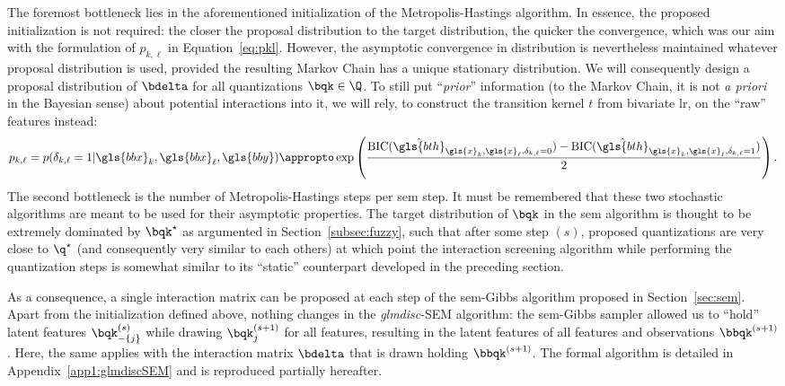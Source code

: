The foremost bottleneck lies in the aforementioned initialization of the Metropolis-Hastings algorithm. In essence, the proposed initialization is not required: the closer the proposal distribution to the target distribution, the quicker the convergence, which was our aim with the formulation of $p_{k,\ell}$ in Equation~\eqref{eq:pkl}. However, the asymptotic convergence in distribution is nevertheless maintained whatever proposal distribution is used, provided the resulting Markov Chain has a unique stationary distribution. We will consequently design a proposal distribution of $\bdelta$ for all quantizations $\bqk \in \Q$. To still put ``\textit{prior}'' information (to the Markov Chain, it is not \textit{a priori} in the Bayesian sense) about potential interactions into it, we will rely, to construct the transition kernel $t$ from bivariate \gls{lr}, on the ``raw'' features instead:
\begin{equation} \label{eq:pklnew}
p_{k,\ell} = p(\delta_{k,\ell} = 1 | \gls{bbx}_k, \gls{bbx}_\ell, \gls{bby}) \appropto \exp \left( \frac{\text{BIC}(\hat{\gls{bth}}_{\gls{x}_k,\gls{x}_\ell,\delta_{k,\ell}=0}) - \text{BIC}(\hat{\gls{bth}}_{\gls{x}_k,\gls{x}_\ell,\delta_{k,\ell}=1})}{2} \right).
\end{equation}
The second bottleneck is the number of Metropolis-Hastings steps per \gls{sem} step. It must be remembered that these two stochastic algorithms are meant to be used for their asymptotic properties. The target distribution of $\bqk$ in the \gls{sem} algorithm is thought to be extremely dominated by $\bqk^\star$ as argumented in Section~\ref{subsec:fuzzy}, such that after some step $(s)$, proposed quantizations are very close to $\q^\star$ (and consequently very similar to each others) at which point the interaction screening algorithm while performing the quantization steps is somewhat similar to its ``static'' counterpart developed in the preceding section.

As a consequence, a single interaction matrix can be proposed at each step of the \gls{sem}-Gibbs algorithm proposed in Section~\ref{sec:sem}. Apart from the initialization defined above, nothing changes in the \textit{glmdisc}-SEM algorithm: the \gls{sem}-Gibbs sampler allowed us to ``hold'' latent features $\bqk_{-\{j\}}^{(s)}$ while drawing $\bqk_{j}^{(s+1)}$ for all features, resulting in the latent features of all features and observations $\bbqk^{(s+1)}$. Here, the same applies with the interaction matrix $\bdelta$ that is drawn holding $\bbqk^{(s+1)}$. The formal algorithm is detailed in Appendix~\ref{app1:glmdiscSEM} and is reproduced partially hereafter.

